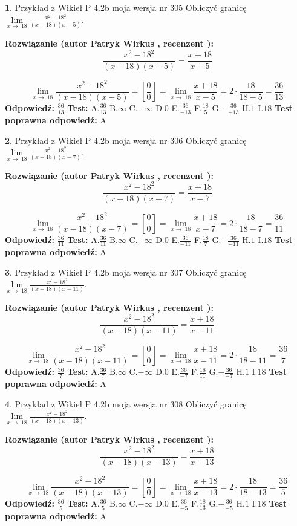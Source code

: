 \documentclass[12pt, a4paper]{article}
\theoremstyle{definition} %
\newtheorem{zad}{}
\newcommand{\zadStart}[1]{\begin{zad}#1\newline}
\newcommand{\zadStop}{\end{zad}}
\newcommand{\rozwStart}[2]{\noindent \textbf{Rozwiązanie (autor #1 , recenzent #2): }\newline}
\newcommand{\rozwStop}{\newline}
\newcommand{\odpStart}{\noindent \textbf{Odpowiedź:}\newline}
\newcommand{\odpStop}{\newline}
\newcommand{\testStart}{\noindent \textbf{Test:}\newline}
\newcommand{\testStop}{\newline}
\newcommand{\kluczStart}{\noindent \textbf{Test poprawna odpowiedź:}\newline}
\newcommand{\kluczStop}{\newline}
\begin{document}
\zadStart{Przykład z Wikieł P 4.2b moja wersja nr 305}
Obliczyć granicę $\lim\limits_{x\to\ 18}\frac{x^{2}-18^{2}}{(x-18)(x-5)}$.
\zadStop
\rozwStart{Patryk Wirkus}{}
$$\frac{x^{2}-18^{2}}{(x-18)(x-5)}=\frac{x+18}{x-5}$$

$$\lim\limits_{x\to\ 18}\frac{x^{2}-18^{2}}{(x-18)(x-5)}=[\frac{0}{0}]=\lim\limits_{x\to\ 18}\frac{x+18}{x-5}=2 \cdot \frac{18}{18-5} = \frac{36}{13}$$
\rozwStop
\odpStart
$\frac{36}{13}$
\odpStop
\testStart
A.$\frac{36}{13}$
B.$\infty$
C.$-\infty$
D.$0$
E.$\frac{36}{-13}$
F.$\frac{18}{5}$
G.$-\frac{36}{-13}$
H.$1$
I.$18$
\testStop
\kluczStart
A
\kluczStop



\zadStart{Przykład z Wikieł P 4.2b moja wersja nr 306}
Obliczyć granicę $\lim\limits_{x\to\ 18}\frac{x^{2}-18^{2}}{(x-18)(x-7)}$.
\zadStop
\rozwStart{Patryk Wirkus}{}
$$\frac{x^{2}-18^{2}}{(x-18)(x-7)}=\frac{x+18}{x-7}$$

$$\lim\limits_{x\to\ 18}\frac{x^{2}-18^{2}}{(x-18)(x-7)}=[\frac{0}{0}]=\lim\limits_{x\to\ 18}\frac{x+18}{x-7}=2 \cdot \frac{18}{18-7} = \frac{36}{11}$$
\rozwStop
\odpStart
$\frac{36}{11}$
\odpStop
\testStart
A.$\frac{36}{11}$
B.$\infty$
C.$-\infty$
D.$0$
E.$\frac{36}{-11}$
F.$\frac{18}{7}$
G.$-\frac{36}{-11}$
H.$1$
I.$18$
\testStop
\kluczStart
A
\kluczStop



\zadStart{Przykład z Wikieł P 4.2b moja wersja nr 307}
Obliczyć granicę $\lim\limits_{x\to\ 18}\frac{x^{2}-18^{2}}{(x-18)(x-11)}$.
\zadStop
\rozwStart{Patryk Wirkus}{}
$$\frac{x^{2}-18^{2}}{(x-18)(x-11)}=\frac{x+18}{x-11}$$

$$\lim\limits_{x\to\ 18}\frac{x^{2}-18^{2}}{(x-18)(x-11)}=[\frac{0}{0}]=\lim\limits_{x\to\ 18}\frac{x+18}{x-11}=2 \cdot \frac{18}{18-11} = \frac{36}{7}$$
\rozwStop
\odpStart
$\frac{36}{7}$
\odpStop
\testStart
A.$\frac{36}{7}$
B.$\infty$
C.$-\infty$
D.$0$
E.$\frac{36}{-7}$
F.$\frac{18}{11}$
G.$-\frac{36}{-7}$
H.$1$
I.$18$
\testStop
\kluczStart
A
\kluczStop



\zadStart{Przykład z Wikieł P 4.2b moja wersja nr 308}
Obliczyć granicę $\lim\limits_{x\to\ 18}\frac{x^{2}-18^{2}}{(x-18)(x-13)}$.
\zadStop
\rozwStart{Patryk Wirkus}{}
$$\frac{x^{2}-18^{2}}{(x-18)(x-13)}=\frac{x+18}{x-13}$$

$$\lim\limits_{x\to\ 18}\frac{x^{2}-18^{2}}{(x-18)(x-13)}=[\frac{0}{0}]=\lim\limits_{x\to\ 18}\frac{x+18}{x-13}=2 \cdot \frac{18}{18-13} = \frac{36}{5}$$
\rozwStop
\odpStart
$\frac{36}{5}$
\odpStop
\testStart
A.$\frac{36}{5}$
B.$\infty$
C.$-\infty$
D.$0$
E.$\frac{36}{-5}$
F.$\frac{18}{13}$
G.$-\frac{36}{-5}$
H.$1$
I.$18$
\testStop
\kluczStart
A
\kluczStop
\end{document}

